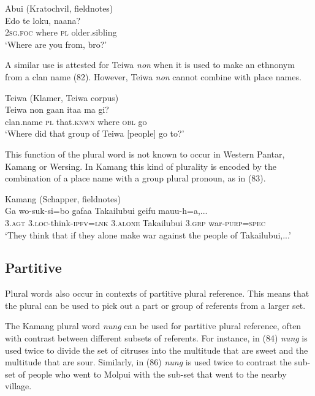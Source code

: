 \ea%
\label{ex:81}
Abui (Kratochvil, fieldnotes)\\
\gll  Edo te loku, {naana?}\\
   \textsc{2sg.foc} where \textsc{pl} older.sibling \\
\glt `Where are you from, bro?'
\z






A similar use is attested for Teiwa \textit{non} when it is used to make an ethnonym from a clan name (82). However, Teiwa \textit{non} cannot combine with place names.


\ea%
\label{ex:82}
 Teiwa (Klamer, Teiwa corpus)\\
\gll  Teiwa non ga{{\textglotstop}}{an} {ita}{{\textglotstop}}{a} ma gi? \\
   clan.name \textsc{pl} that.\textsc{knwn} where \textsc{obl} go  \\
\glt `Where did that group of Teiwa [people] go to?'
\z






This function of the plural word is not known to occur in Western Pantar, Kamang or Wersing. In Kamang this kind of plurality is encoded by the combination of a place name with a group plural pronoun, as in (83).


\ea%
\label{ex:83}
Kamang (Schapper, fieldnotes)\\
\gll  Ga wo-suk-si=bo gafaa Takailubui geifu {mauu-h=a},...\\
   3.\textsc{agt} \textsc{3.loc-}think\textsc{-ipfv=lnk} 3.\textsc{alone} Takailubui 3.\textsc{grp} war-\textsc{purp}=\textsc{spec} \\
\glt `They think that if they alone make war against the people of Takailubui,...'
\z






\subsection{Partitive} %
Plural words also occur in contexts of partitive plural reference. This means that the plural can be used to pick out a part or group of referents from a larger set.

The Kamang plural word \textit{nung} can be used for partitive plural reference, often with contrast between different subsets of referents. For instance, in (84) \textit{nung} is used twice to divide the set of citruses into the multitude that are sweet and the multitude that are sour. Similarly, in (86) \textit{nung} is used twice to contrast the sub-set of people who went to Molpui with the sub-set that went to the nearby village.


